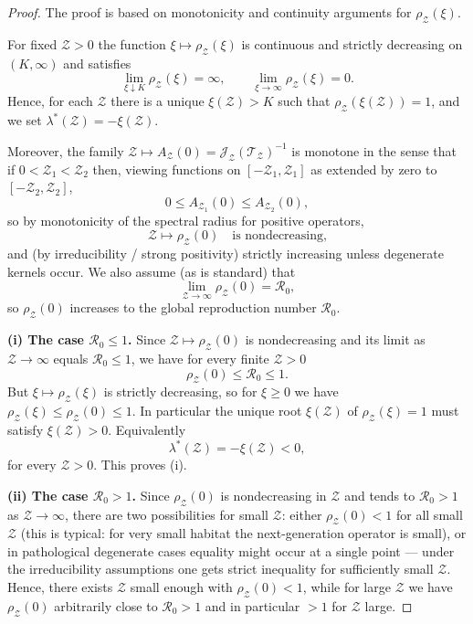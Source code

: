 \documentclass[a4paper,11pt]{amsart}
\theoremstyle{definition}
\numberwithin{equation}{section}
\theoremstyle{definition}
\begin{document}
\begin{proof}
The proof is based on monotonicity and continuity arguments for $\rho_{\mathcal Z}(\xi)$.

For fixed $\mathcal Z>0$ the function $\xi\mapsto\rho_{\mathcal Z}(\xi)$ is continuous and strictly decreasing on $(K,\infty)$ and satisfies
\[
\lim_{\xi\downarrow K} \rho_{\mathcal Z}(\xi)=\infty,\qquad \lim_{\xi\to\infty}\rho_{\mathcal Z}(\xi)=0.
\]
Hence, for each $\mathcal Z$ there is a unique $\xi(\mathcal Z)>K$ such that $\rho_{\mathcal Z}(\xi(\mathcal Z))=1$, and we set $\lambda^\ast(\mathcal Z)=-\xi(\mathcal Z)$.

Moreover, the family $\mathcal Z\mapsto A_{\mathcal Z}(0)=\mathscr J_{\mathcal Z}(\mathscr T_{\mathcal Z})^{-1}$ is monotone in the sense that if $0<\mathcal Z_1<\mathcal Z_2$ then, viewing functions on $[-\mathcal Z_1,\mathcal Z_1]$ as extended by zero to $[-\mathcal Z_2,\mathcal Z_2]$,
\[
0 \leq A_{\mathcal Z_1}(0) \leq A_{\mathcal Z_2}(0),
\]
so by monotonicity of the spectral radius for positive operators,
\[
\mathcal Z\mapsto \rho_{\mathcal Z}(0)
\quad\text{is nondecreasing,}
\]
and (by irreducibility / strong positivity) strictly increasing unless degenerate kernels occur.  We also assume (as is standard) that
\[
\lim_{\mathcal Z\to\infty}\rho_{\mathcal Z}(0)=\mathcal R_0,
\]
so \(\rho_{\mathcal Z}(0)\) increases to the global reproduction number \(\mathcal R_0\).

\medskip\noindent\textbf{(i) The case \(\mathcal R_0\leq 1\).}
Since \(\mathcal Z \mapsto \rho_{\mathcal Z}(0)\) is nondecreasing and its limit as \(\mathcal Z\to\infty\) equals \(\mathcal R_0\leq 1\), we have for every finite \(\mathcal Z>0\)
\[
\rho_{\mathcal Z}(0)\leq \mathcal R_0 \leq 1.
\]
But \(\xi\mapsto\rho_{\mathcal Z}(\xi)\) is strictly decreasing, so for \(\xi\geq0\) we have \(\rho_{\mathcal Z}(\xi)\leq \rho_{\mathcal Z}(0)\leq 1\). In particular the unique root \(\xi(\mathcal Z)\) of \(\rho_{\mathcal Z}(\xi)=1\) must satisfy \(\xi(\mathcal Z)>0\). Equivalently
\[
\lambda^\ast(\mathcal Z) = -\xi(\mathcal Z) < 0,
\]
for every \(\mathcal Z>0\). This proves (i).

\medskip\noindent\textbf{(ii) The case \(\mathcal R_0 >1\).}
Since \(\rho_{\mathcal Z}(0)\) is nondecreasing in \(\mathcal Z\) and tends to \(\mathcal R_0>1\) as \(\mathcal Z\to\infty\), there are two possibilities for small \(\mathcal Z\):
either \(\rho_{\mathcal Z}(0)<1\) for all small \(\mathcal Z\) (this is typical: for very small habitat the next-generation operator is small), or in pathological degenerate cases equality might occur at a single point — under the irreducibility assumptions one gets strict inequality for sufficiently small \(\mathcal Z\). Hence, there exists \(\mathcal Z\) small enough with \(\rho_{\mathcal Z}(0)<1\), while for large \(\mathcal Z\) we have \(\rho_{\mathcal Z}(0)\) arbitrarily close to \(\mathcal R_0>1\) and in particular \(>1\) for \(\mathcal Z\) large.


\end{proof}
\end{document}
